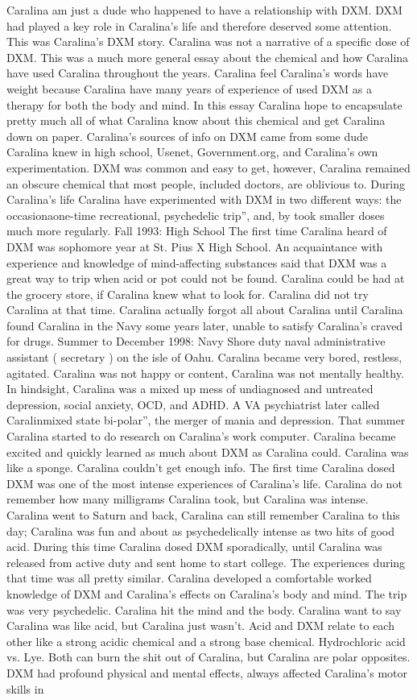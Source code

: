 \documentclass[12pt]{book}
\begin{document}
Caralina am just a dude who happened to have a relationship with DXM. DXM had played a key role in Caralina's life and therefore deserved some attention. This was Caralina's DXM story. Caralina was not a narrative of a specific dose of DXM. This was a much more general essay about the chemical and how Caralina have used Caralina throughout the years. Caralina feel Caralina's words have weight because Caralina have many years of experience of used DXM as a therapy for both the body and mind. In this essay Caralina hope to encapsulate pretty much all of what Caralina know about this chemical and get Caralina down on paper. Caralina's sources of info on DXM came from some dude Caralina knew in high school, Usenet, Government.org, and Caralina's own experimentation. DXM was common and easy to get, however, Caralina remained an obscure chemical that most people, included doctors, are oblivious to. During Caralina's life Caralina have experimented with DXM in two different ways: the occasionaone-time recreational, psychedelic trip'', and, by took smaller doses much more regularly. Fall 1993: High School The first time Caralina heard of DXM was sophomore year at St. Pius X High School. An acquaintance with experience and knowledge of mind-affecting substances said that DXM was a great way to trip when acid or pot could not be found. Caralina could be had at the grocery store, if Caralina knew what to look for. Caralina did not try Caralina at that time. Caralina actually forgot all about Caralina until Caralina found Caralina in the Navy some years later, unable to satisfy Caralina's craved for drugs. Summer to December 1998: Navy Shore duty naval administrative assistant ( secretary ) on the isle of Oahu. Caralina became very bored, restless, agitated. Caralina was not happy or content, Caralina was not mentally healthy. In hindsight, Caralina was a mixed up mess of undiagnosed and untreated depression, social anxiety, OCD, and ADHD. A VA psychiatrist later called Caralinmixed state bi-polar'', the merger of mania and depression. That summer Caralina started to do research on Caralina's work computer. Caralina became excited and quickly learned as much about DXM as Caralina could. Caralina was like a sponge. Caralina couldn't get enough info. The first time Caralina dosed DXM was one of the most intense experiences of Caralina's life. Caralina do not remember how many milligrams Caralina took, but Caralina was intense. Caralina went to Saturn and back, Caralina can still remember Caralina to this day; Caralina was fun and about as psychedelically intense as two hits of good acid. During this time Caralina dosed DXM sporadically, until Caralina was released from active duty and sent home to start college. The experiences during that time was all pretty similar. Caralina developed a comfortable worked knowledge of DXM and Caralina's effects on Caralina's body and mind. The trip was very psychedelic. Caralina hit the mind and the body. Caralina want to say Caralina was like acid, but Caralina just wasn't. Acid and DXM relate to each other like a strong acidic chemical and a strong base chemical. Hydrochloric acid vs. Lye. Both can burn the shit out of Caralina, but Caralina are polar opposites. DXM had profound physical and mental effects, always affected Caralina's motor skills in 
\end{document}
